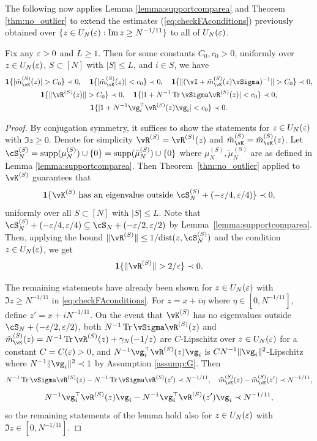 The following now applies Lemma \ref{lemma:supportcomparea} and
Theorem \ref{thm:no_outlier} to extend the
estimates (\ref{eq:checkFAconditions}) previously obtained over
$\{z \in U_N(\varepsilon):\operatorname{Im} z \geq N^{-1/11}\}$ to all of $U_N(\varepsilon)$.
\begin{lemma}\label{lemma:FAconditions}
Fix any $\varepsilon>0$ and $L \geq 1$. Then for some constants $C_0,c_0>0$, uniformly
over $z \in U_N(\varepsilon)$, $S \subset [N]$ with $|S| \leq L$, and $i \in S$,
we have
\[\begin{gathered}
\bI\{|\tilde m_{\vK}^{(S)}(z)|>C_0\} \prec 0,
\quad \bI\{|\tilde m_{\vK}^{(S)}(z)|<c_0\} \prec 0,
\quad \bI\{\|(\vI+\tilde m_{\vK}^{(S)}(z)\vSigma)^{-1}\|>C_0\} \prec 0,\\
\bI\{\|\vR^{(S)}(z)\|>C_0\} \prec 0,
\quad \bI\{|1+N^{-1}\Tr \vSigma\vR^{(S)}(z)|<c_0\} \prec 0,\\
\bI\{|1+N^{-1}\vg_i^\top \vR^{(S)}(z)\vg_i|<c_0\} \prec 0.
\end{gathered}\]
\end{lemma}
\begin{proof}
By conjugation symmetry, it suffices to show the statements for
$z \in U_N(\varepsilon)$ with $\Im z \geq 0$. Denote for simplicity
$\vR^{(S)}=\vR^{(S)}(z)$ and $\tilde m_{\vK}^{(S)}=\tilde m_{\vK}^{(S)}(z)$.
Let $\cS_N^{(S)}=\supp{\mu_N^{(S)}} \cup \{0\}
=\supp{\tilde \mu_N^{(S)}} \cup \{0\}$ where $\mu_N^{(S)},\tilde \mu_N^{(S)}$
are as defined in Lemma \ref{lemma:supportcomparea}.
Then Theorem~\ref{thm:no_outlier} applied to $\vK^{(S)}$ guarantees that
\[\bI\{\vK^{(S)} \text{ has an eigenvalue outside } \cS_N^{(S)}+(-\eps/4,\eps/4)\} \prec 0,\]
uniformly over all $S \subset [N]$ with $|S| \leq L$. Note that
$\cS_N^{(S)}+(-\eps/4,\eps/4) \subseteq \cS_N+(-\eps/2,\eps/2)$ by
Lemma~\ref{lemma:supportcomparea}. Then, applying the bound $\|\vR^{(S)}\|
\leq 1/\dist{z,\cS_N^{(S)}}$ and the condition $z \in U_N(\varepsilon)$, we get
\begin{equation}\label{eq:operatornormbound}
\bI\{\|\vR^{(S)}\|>2/\eps\} \prec 0.
\end{equation}

The remaining statements have already been shown for $z \in U_N(\varepsilon)$ with
$\Im z \geq N^{-1/11}$ in \eqref{eq:checkFAconditions}. 
For $z=x+i\eta$ where $\eta \in [0,N^{-1/11}]$, define $z'=x+i N^{-1/11}$.
On the event that $\vK^{(S)}$ has no eigenvalues
outside $\cS_N+(-\eps/2,\eps/2)$, both $N^{-1}\Tr \vSigma \vR^{(S)}(z)$ and
$\tilde m_{\vK}^{(S)}(z)=N^{-1}\Tr \vR^{(S)}(z)+\gamma_N(-1/z)$ are
$C$-Lipschitz over $z \in U_N(\varepsilon)$ for a constant $C=C(\varepsilon)>0$,
and $N^{-1}\vg_i^\top \vR^{(S)}(z)\vg_i$ is $CN^{-1}\|\vg_i\|^2$-Lipschitz where
$N^{-1}\|\vg_i\|^2 \prec 1$ by Assumption \ref{assump:G}. Then
\[N^{-1}\Tr \vSigma \vR^{(S)}(z)-N^{-1}\Tr \vSigma \vR^{(S)}(z')
\prec N^{-1/11}, \quad
\tilde m_{\vK}^{(S)}(z)-\tilde m_{\vK}^{(S)}(z')
\prec N^{-1/11},\]
\[N^{-1}\vg_i^\top \vR^{(S)}(z)\vg_i-N^{-1}\vg_i^\top \vR^{(S)}(z')\vg_i
\prec N^{-1/11},\]
so the remaining statements of the lemma hold also for $z \in U_N(\varepsilon)$
with $\Im z \in [0,N^{-1/11}]$.
\end{proof}

